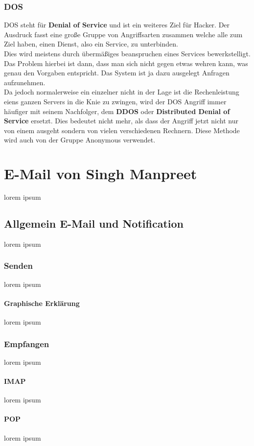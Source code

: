 \documentclass[12pt,a4paper]{report}
\begin{document}
\subsection{DOS}
DOS steht für \textbf{Denial of Service} und ist ein weiteres Ziel für Hacker. Der Ausdruck fasst eine große Gruppe von Angriffsarten zusammen welche alle zum Ziel haben, einen Dienst, also ein Service, zu unterbinden.\\
Dies wird meistens durch übermäßiges beanspruchen eines Services bewerkstelligt. Das Problem hierbei ist dann, dass man sich nicht gegen etwas wehren kann, was genau den Vorgaben entspricht. Das System ist ja dazu ausgelegt Anfragen aufzunehmen.\\

Da jedoch normalerweise ein einzelner nicht in der Lage ist die Rechenleistung eiens ganzen Servers in die Knie zu zwingen, wird der DOS Angriff immer häufiger mit seinem Nachfolger, dem \textbf{DDOS} oder \textbf{Distributed Denial of Service} ersetzt. Dies bedeutet nicht mehr, als dass der Angriff jetzt nicht nur von einem ausgeht sondern von vielen verschiedenen Rechnern. Diese Methode wird auch von der Gruppe Anonymous verwendet.

\chapter{E-Mail von Singh Manpreet}
lorem ipsum
\section{Allgemein E-Mail und Notification}
lorem ipsum
\subsection{Senden}
lorem ipsum
\subsubsection{Graphische Erklärung}
lorem ipsum
\subsection{Empfangen}
lorem ipsum
\subsubsection{IMAP}
lorem ipsum
\subsubsection{POP}
lorem ipsum
\end{document}
